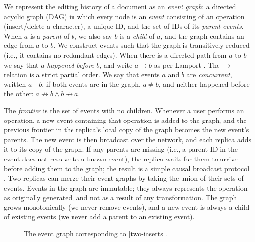 \documentclass[sigplan,10pt]{acmart}
\begin{document}
We represent the editing history of a document as an \emph{event graph}: a directed acyclic graph (DAG) in which every node is an \emph{event} consisting of an operation (insert/delete a character), a unique ID, and the set of IDs of its \emph{parent events}.
When $a$ is a \emph{parent} of $b$, we also say $b$ is a \emph{child} of $a$, and the graph contains an edge from $a$ to $b$.
We construct events such that the graph is transitively reduced (i.e., it contains no redundant edges).
When there is a directed path from $a$ to $b$ we say that $a$ \emph{happened before} $b$, and write $a \rightarrow b$ as per Lamport \cite{Lamport1978}.
The $\rightarrow$ relation is a strict partial order.
We say that events $a$ and $b$ are \emph{concurrent}, written $a \parallel b$, if both events are in the graph, $a \neq b$, and neither happened before the other: $a \not\rightarrow b \wedge b \not\rightarrow a$.

The \emph{frontier} is the set of events with no children.
Whenever a user performs an operation, a new event containing that operation is added to the graph, and the previous frontier in the replica's local copy of the graph becomes the new event's parents.
The new event is then broadcast over the network, and each replica adds it to its copy of the graph.
If any parents are missing (i.e., a parent ID in the event does not resolve to a known event), the replica waits for them to arrive before adding them to the graph; the result is a simple causal broadcast protocol \cite{Birman1991,Cachin2011}.
Two replicas can merge their event graphs by taking the union of their sets of events.
Events in the graph are immutable; they always represents the operation as originally generated, and not as a result of any transformation.
The graph grows monotonically (we never remove events), and a new event is always a child of existing events (we never add a parent to an existing event).

\begin{figure}
  \caption{The event graph corresponding to \autoref{two-inserts}.}
  \label{graph-example}
\end{figure}
\end{document}
